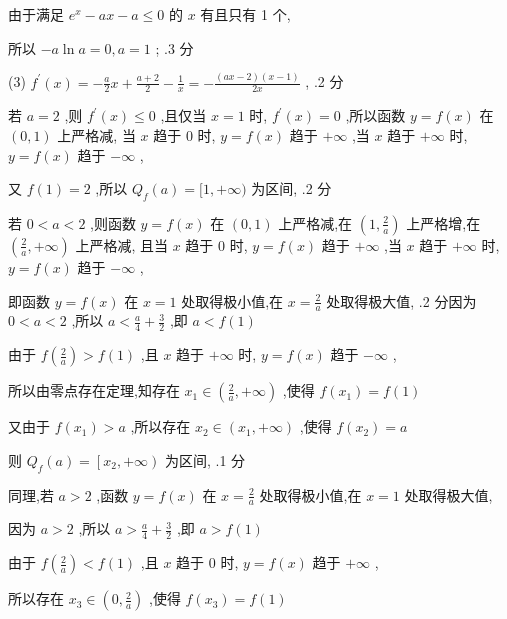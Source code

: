 \documentclass[10pt]{article}
\begin{document}
由于满足 \({e}^{x} - {ax} - a \leq  0\) 的 \(x\) 有且只有 1 个,

所以 \(- a\ln a = 0,a = 1\) ; .3 分

(3) \({f}^{\prime }\left( x\right)  =  - \frac{a}{2}x + \frac{a + 2}{2} - \frac{1}{x} =  - \frac{\left( {{ax} - 2}\right) \left( {x - 1}\right) }{2x}\) , .2 分

若 \(a = 2\) ,则 \({f}^{\prime }\left( x\right)  \leq  0\) ,且仅当 \(x = 1\) 时, \({f}^{\prime }\left( x\right)  = 0\) ,所以函数 \(y = f\left( x\right)\) 在 \(\left( {0,1}\right)\) 上严格减, 当 \(x\) 趋于 0 时, \(y = f\left( x\right)\) 趋于 \(+ \infty\) ,当 \(x\) 趋于 \(+ \infty\) 时, \(y = f\left( x\right)\) 趋于 \(- \infty\) ,

又 \(f\left( 1\right)  = 2\) ,所以 \({Q}_{f}\left( a\right)  = \lbrack 1, + \infty )\) 为区间, .2 分

若 \(0 < a < 2\) ,则函数 \(y = f\left( x\right)\) 在 \(\left( {0,1}\right)\) 上严格减,在 \(\left( {1,\frac{2}{a}}\right)\) 上严格增,在 \(\left( {\frac{2}{a}, + \infty }\right)\) 上严格减, 且当 \(x\) 趋于 0 时, \(y = f\left( x\right)\) 趋于 \(+ \infty\) ,当 \(x\) 趋于 \(+ \infty\) 时, \(y = f\left( x\right)\) 趋于 \(- \infty\) ,

即函数 \(y = f\left( x\right)\) 在 \(x = 1\) 处取得极小值,在 \(x = \frac{2}{a}\) 处取得极大值, .2 分因为 \(0 < a < 2\) ,所以 \(a < \frac{a}{4} + \frac{3}{2}\) ,即 \(a < f\left( 1\right)\)

由于 \(f\left( \frac{2}{a}\right)  > f\left( 1\right)\) ,且 \(x\) 趋于 \(+ \infty\) 时, \(y = f\left( x\right)\) 趋于 \(- \infty\) ,

所以由零点存在定理,知存在 \({x}_{1} \in  \left( {\frac{2}{a}, + \infty }\right)\) ,使得 \(f\left( {x}_{1}\right)  = f\left( 1\right)\)

又由于 \(f\left( {x}_{1}\right)  > a\) ,所以存在 \({x}_{2} \in  \left( {{x}_{1}, + \infty }\right)\) ,使得 \(f\left( {x}_{2}\right)  = a\)

则 \({Q}_{f}\left( a\right)  = \left\lbrack  {{x}_{2}, + \infty }\right)\) 为区间, .1 分

同理,若 \(a > 2\) ,函数 \(y = f\left( x\right)\) 在 \(x = \frac{2}{a}\) 处取得极小值,在 \(x = 1\) 处取得极大值,

因为 \(a > 2\) ,所以 \(a > \frac{a}{4} + \frac{3}{2}\) ,即 \(a > f\left( 1\right)\)

由于 \(f\left( \frac{2}{a}\right)  < f\left( 1\right)\) ,且 \(x\) 趋于 0 时, \(y = f\left( x\right)\) 趋于 \(+ \infty\) ,

所以存在 \({x}_{3} \in  \left( {0,\frac{2}{a}}\right)\) ,使得 \(f\left( {x}_{3}\right)  = f\left( 1\right)\)
\end{document}
